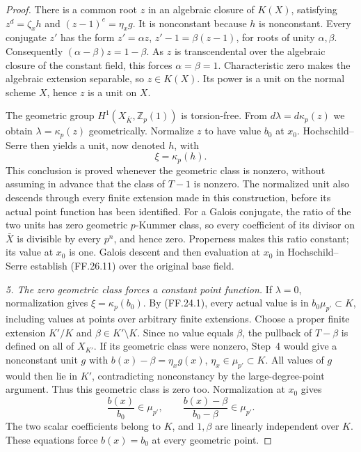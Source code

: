 \begin{proof}
There is a common root \(z\) in an algebraic closure
of \(K(X)\), satisfying
\(z^d=\zeta_xh\) and \((z-1)^e=\eta_xg\).
It is nonconstant because \(h\) is nonconstant.
Every conjugate \(z'\) has the form
\(z'=\alpha z\), \(z'-1=\beta(z-1)\), for
roots of unity \(\alpha,\beta\). Consequently
\((\alpha-\beta)z=1-\beta\). As \(z\) is
transcendental over the algebraic closure of the
constant field, this forces \(\alpha=\beta=1\).
Characteristic zero makes the algebraic extension
separable, so \(z\in K(X)\). Its power is a unit
on the normal scheme \(X\), hence \(z\) is a
unit on \(X\).

The geometric group \(H^1(X_{\bar K},\mathbb Z_p(1))\)
is torsion-free. From \(d\lambda=d\kappa_p(z)\)
we obtain \(\lambda=\kappa_p(z)\) geometrically.
Normalize \(z\) to have value \(b_0\) at \(x_0\).
Hochschild--Serre then yields a unit, now denoted \(h\),
with
\[
                             \xi=\kappa_p(h).            \tag{FF.26.11}
\]
This conclusion is proved whenever the geometric class
is nonzero, without assuming in advance that the
class of \(T-1\) is nonzero. The normalized unit
also descends through every finite extension made in
this construction, before its actual point function
has been identified. For a Galois conjugate, the ratio
of the two units has zero geometric \(p\)-Kummer class,
so every coefficient of its divisor on \(\bar X\)
is divisible by every \(p^n\), and hence zero.
Properness makes this ratio constant; its value at
\(x_0\) is one. Galois descent and then evaluation
at \(x_0\) in Hochschild--Serre establish
(FF.26.11) over the original base field.

\emph{5. The zero geometric class forces a constant point function.}
If \(\lambda=0\), normalization gives
\(\xi=\kappa_p(b_0)\). By (FF.24.1), every
actual value is in \(b_0\mu_{p'}\subset K\),
including values at points over arbitrary finite
extensions. Choose a proper finite extension
\(K'/K\) and \(\beta\in K'\setminus K\).
Since no value equals \(\beta\), the pullback of
\(T-\beta\) is defined on all of \(X_{K'}\).
If its geometric class were nonzero, Step~4 would
give a nonconstant unit \(g\) with
\(b(x)-\beta=\eta_xg(x)\),
\(\eta_x\in\mu_{p'}\subset K\). All values of
\(g\) would then lie in \(K'\), contradicting
nonconstancy by the large-degree-point argument.
Thus this geometric class is zero too. Normalization
at \(x_0\) gives
\[
              \frac{b(x)}{b_0}\in\mu_{p'},\qquad
              \frac{b(x)-\beta}{b_0-\beta}\in\mu_{p'}.
\]
The two scalar coefficients belong to \(K\),
and \(1,\beta\) are linearly independent over
\(K\). These equations force \(b(x)=b_0\) at
every geometric point.


\end{proof}

